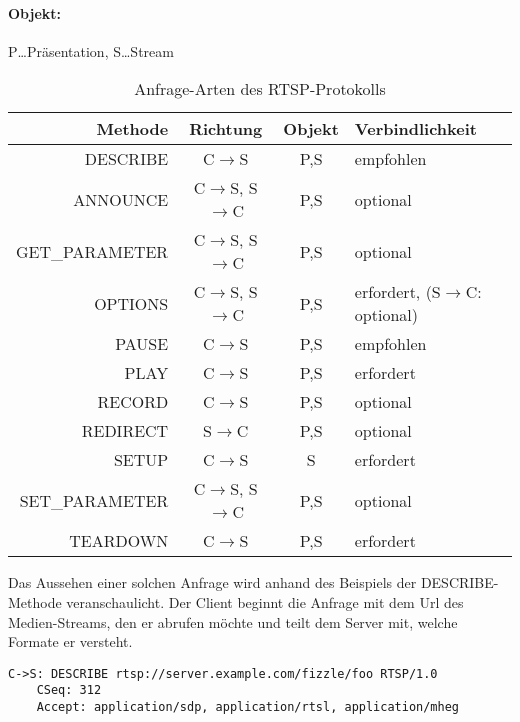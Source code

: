 \paragraph{Objekt:}P\dots Präsentation, S\dots Stream
\begin{table}[H]
    \centering\begin{tabular}{|r|c|c|l|}
        \hline%
        Methode         &Richtung                           &Objekt &Verbindlichkeit\\
        \hline%
        DESCRIBE        &C$\rightarrow$S                    &P,S    &empfohlen\\
        ANNOUNCE        &C$\rightarrow$S, S$\rightarrow$C   &P,S    &optional\\
        GET\_PARAMETER  &C$\rightarrow$S, S$\rightarrow$C   &P,S    &optional\\
        OPTIONS         &C$\rightarrow$S, S$\rightarrow$C   &P,S    &erfordert, (S$\rightarrow$C: optional)\\
        PAUSE           &C$\rightarrow$S                    &P,S    &empfohlen\\
        PLAY            &C$\rightarrow$S                    &P,S    &erfordert\\
        RECORD          &C$\rightarrow$S                    &P,S    &optional\\
        REDIRECT        &S$\rightarrow$C                    &P,S    &optional\\
        SETUP           &C$\rightarrow$S                    &S      &erfordert\\
        SET\_PARAMETER  &C$\rightarrow$S, S$\rightarrow$C   &P,S    &optional\\
        TEARDOWN        &C$\rightarrow$S                    &P,S    &erfordert\\
        \hline%
    \end{tabular}
    \caption{Anfrage-Arten des RTSP-Protokolls}
    \label{tab:rtsp-req}
\end{table}
Das Aussehen einer solchen Anfrage wird anhand des Beispiels der DESCRIBE-Methode veranschaulicht.
Der Client beginnt die Anfrage mit dem Url des Medien-Streams, den er abrufen möchte und teilt dem Server mit, welche Formate er versteht.
\begin{lstlisting}
C->S: DESCRIBE rtsp://server.example.com/fizzle/foo RTSP/1.0
    CSeq: 312
    Accept: application/sdp, application/rtsl, application/mheg
\end{lstlisting}

